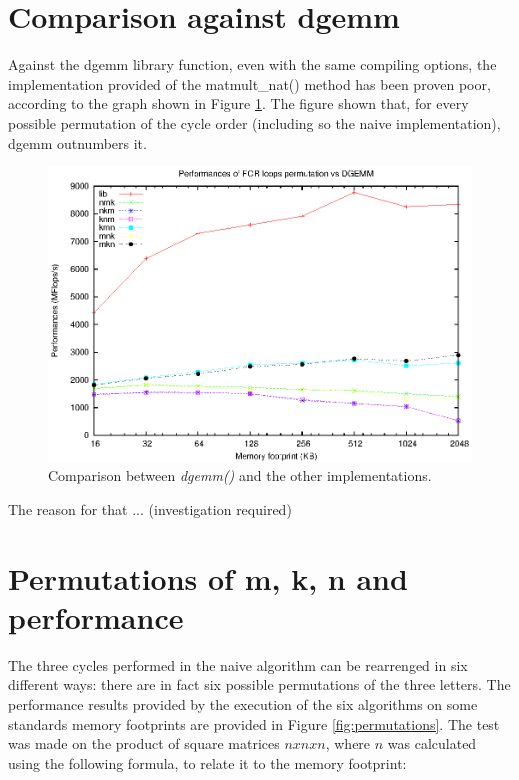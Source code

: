  
\section{Comparison against dgemm}

Against the dgemm library function, even with the same compiling options, the implementation provided of the matmult\_nat() method has been proven poor, according to the graph shown in Figure \ref{fig:natdgemmcomp}. The figure shown that, for every possible permutation of the cycle order (including so the naive implementation), dgemm outnumbers it.

\begin{figure}[here]
\centering
\includegraphics[width=\textwidth]{results/dgemm.eps}
\caption{Comparison between \emph{dgemm()} and the other implementations.}
\label{fig:natdgemmcomp}
\end{figure}


The reason for that ... (investigation required)

\section{Permutations of m, k, n and performance}
The three cycles performed in the naive algorithm can be rearrenged in six different ways: there are in fact six possible permutations of the three letters. The performance results provided by the execution of the six algorithms on some standards memory footprints are provided in Figure \ref{fig:permutations}. The test was made on the product of square matrices $nxnxn$, where $n$ was calculated using the following formula, to relate it to the memory footprint:

